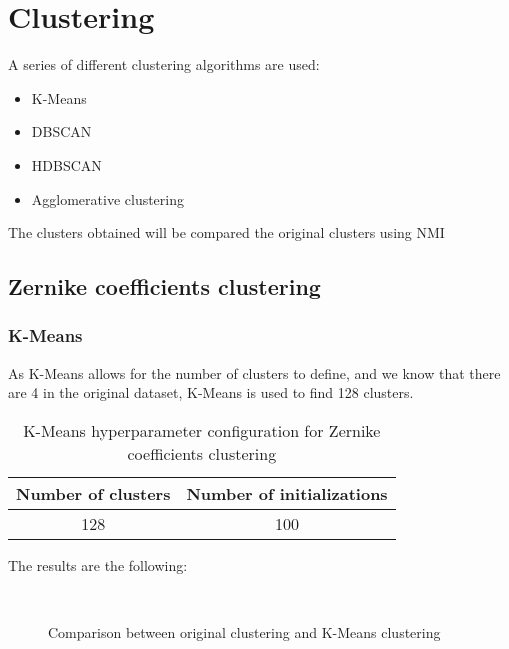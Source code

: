 \section{Clustering}
	
		
		A series of different clustering algorithms are used:
		\begin{itemize}
			\item K-Means
			\item DBSCAN
			\item HDBSCAN
			\item Agglomerative clustering
		\end{itemize}
		
		The clusters obtained will be compared the original clusters using NMI
		
	\subsection{Zernike coefficients clustering}
		
		\subsubsection{K-Means}
			
			As K-Means allows for the number of clusters to define, and we know that there are 4 in the original dataset, K-Means is used to find 128 clusters.
			
			\begin{table}[h!]
				\centering
				\begin{tabular}{|c|c|}
					\hline
					\textbf{Number of clusters} & \textbf{Number of initializations}\\
					\hline
					128 & 100\\
					\hline
				\end{tabular}
				\caption{K-Means hyperparameter configuration for Zernike coefficients clustering}
			\end{table}
		
			The results are the following:
			
			\begin{figure*}[ht!]
				\centering
				\hspace{\fill}
				\\
					
				\hspace{\fill}
				\caption{Comparison between original clustering and K-Means clustering}
			\end{figure*}
		\FloatBarrier
		

